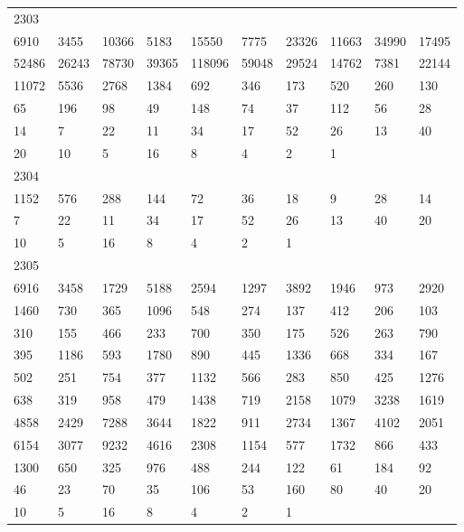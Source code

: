 \begin{longtable}{*{10}{l}}
2303&&&&&&&&&\\
6910& 3455& 10366& 5183& 15550& 7775& 23326& 11663& 34990& 17495\\
52486& 26243& 78730& 39365& 118096& 59048& 29524& 14762& 7381& 22144\\
11072& 5536& 2768& 1384& 692& 346& 173& 520& 260& 130\\
65& 196& 98& 49& 148& 74& 37& 112& 56& 28\\
14& 7& 22& 11& 34& 17& 52& 26& 13& 40\\
20& 10& 5& 16& 8& 4& 2& 1& \\

2304&&&&&&&&&\\
1152& 576& 288& 144& 72& 36& 18& 9& 28& 14\\
7& 22& 11& 34& 17& 52& 26& 13& 40& 20\\
10& 5& 16& 8& 4& 2& 1& \\

2305&&&&&&&&&\\
6916& 3458& 1729& 5188& 2594& 1297& 3892& 1946& 973& 2920\\
1460& 730& 365& 1096& 548& 274& 137& 412& 206& 103\\
310& 155& 466& 233& 700& 350& 175& 526& 263& 790\\
395& 1186& 593& 1780& 890& 445& 1336& 668& 334& 167\\
502& 251& 754& 377& 1132& 566& 283& 850& 425& 1276\\
638& 319& 958& 479& 1438& 719& 2158& 1079& 3238& 1619\\
4858& 2429& 7288& 3644& 1822& 911& 2734& 1367& 4102& 2051\\
6154& 3077& 9232& 4616& 2308& 1154& 577& 1732& 866& 433\\
1300& 650& 325& 976& 488& 244& 122& 61& 184& 92\\
46& 23& 70& 35& 106& 53& 160& 80& 40& 20\\
10& 5& 16& 8& 4& 2& 1& \\


\end{longtable}
